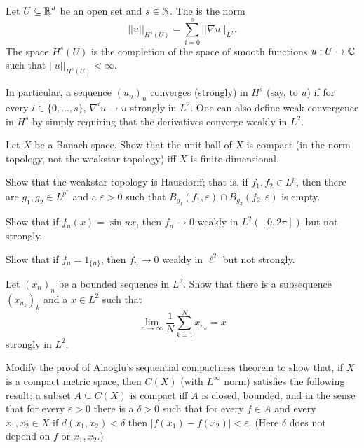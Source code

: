 \begin{definition}
Let $U \subseteq \mathbb{R}^d$ be an open set and $s \in \mathbb{N}$.
The  is the norm
$$||u||_{H^s(U)} = \sum_{i=0}^s ||\nabla u||_{L^2}.$$
The space $H^s(U)$ is the completion of the space of smooth functions $u: U \to \mathbb{C}$ such that $||u||_{H^s(U)} < \infty$.
\end{definition}
In particular, a sequence $(u_n)_n$ converges (strongly) in $H^s$ (say, to $u$) if for every $i \in \{0, \dots, s\}$, $\nabla^iu \to u$ strongly in $L^2$.
One can also define weak convergence in $H^s$ by simply requiring that the derivatives converge weakly in $L^2$.

\begin{exercise}
\label{unit ball compactness}
Let $X$ be a Banach space. Show that the unit ball of $X$ is compact (in the norm topology, not the weakstar topology) iff $X$ is finite-dimensional.
\end{exercise}

\begin{exercise}
\label{weakstar is hausdorff}
Show that the weakstar topology is Hausdorff; that is, if $f_1, f_2 \in L^p$, then there are $g_1, g_2 \in L^{p^*}$ and a $\varepsilon > 0$ such that $B_{g_1}(f_1, \varepsilon) \cap B_{g_2}(f_2, \varepsilon)$ is empty.
\end{exercise}

\begin{exercise}
Show that if $f_n(x) = \sin nx$, then $f_n \to 0$ weakly in $L^2([0, 2\pi])$ but not strongly.
\end{exercise}

\begin{exercise}
Show that if $f_n = 1_{\{n\}}$, then $f_n \to 0$ weakly in $\ell^2$ but not strongly.
\end{exercise}

\begin{exercise}
Let $(x_n)_n$ be a bounded sequence in $L^2$. Show that there is a subsequence $(x_{n_k})_k$ and a $x \in L^2$ such that
$$\lim_{n \to \infty} \frac{1}{N} \sum_{k=1}^N x_{n_k} = x$$
strongly in $L^2$.
\end{exercise}

\begin{exercise}
\label{Ascoli}
Modify the proof of Alaoglu's sequential compactness theorem to show that, if $X$ is a compact metric space, then $C(X)$ (with $L^\infty$ norm) satisfies the following result: a subset $A \subseteq C(X)$ is compact iff $A$ is closed, bounded, and  in the sense that for every $\varepsilon > 0$ there is a $\delta > 0$ such that for every $f \in A$ and every $x_1,x_2 \in X$ if $d(x_1, x_2) < \delta$ then $|f(x_1) - f(x_2)| < \varepsilon$. (Here $\delta$ does not depend on $f$ or $x_1, x_2$.)
\end{exercise}


